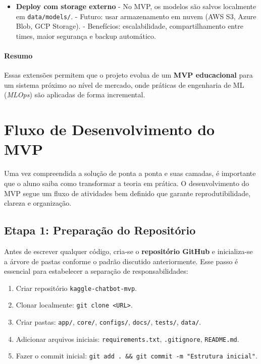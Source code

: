 \documentclass[12pt,a4paper]{article}
\begin{document}
\begin{itemize}
  \item \textbf{Deploy com storage externo}  
  - No MVP, os modelos são salvos localmente em \texttt{data/models/}.  
  - Futuro: usar armazenamento em nuvem (AWS S3, Azure Blob, GCP Storage).  
  - Benefícios: escalabilidade, compartilhamento entre times, maior segurança e backup automático.  
\end{itemize}

\paragraph{Resumo}  
Essas extensões permitem que o projeto evolua de um \textbf{MVP educacional} para um sistema próximo ao nível de mercado, onde práticas de engenharia de ML (\textit{MLOps}) são aplicadas de forma incremental.



\clearpage
\section{Fluxo de Desenvolvimento do MVP}

Uma vez compreendida a solução de ponta a ponta e suas camadas, é importante que o aluno saiba como transformar a teoria em prática. O desenvolvimento do MVP segue um fluxo de atividades bem definido que garante reprodutibilidade, clareza e organização.

\subsection{Etapa 1: Preparação do Repositório}

Antes de escrever qualquer código, cria-se o \textbf{repositório GitHub} e inicializa-se a árvore de pastas conforme o padrão discutido anteriormente. Esse passo é essencial para estabelecer a separação de responsabilidades:

\begin{enumerate}
  \item Criar repositório \texttt{kaggle-chatbot-mvp}.
  \item Clonar localmente: \texttt{git clone <URL>}.
  \item Criar pastas: \texttt{app/}, \texttt{core/}, \texttt{configs/}, \texttt{docs/}, \texttt{tests/}, \texttt{data/}.
  \item Adicionar arquivos iniciais: \texttt{requirements.txt}, \texttt{.gitignore}, \texttt{README.md}.
  \item Fazer o commit inicial: \texttt{git add . \&\& git commit -m "Estrutura inicial"}.
\end{enumerate}
\end{document}
